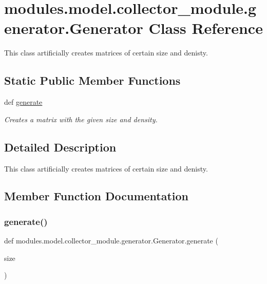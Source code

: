 \hypertarget{classmodules_1_1model_1_1collector__module_1_1generator_1_1_generator}{}\section{modules.\+model.\+collector\+\_\+module.\+generator.\+Generator Class Reference}
\label{classmodules_1_1model_1_1collector__module_1_1generator_1_1_generator}


This class artificially creates matrices of certain size and denisty.  


\subsection*{Static Public Member Functions}
\begin{DoxyCompactItemize}
\item 
def \mbox{\hyperlink{classmodules_1_1model_1_1collector__module_1_1generator_1_1_generator_ab8fb74519a723b30821ba587f5e1223b}{generate}}
\begin{DoxyCompactList}\small\item\em Creates a matrix with the given size and density. \end{DoxyCompactList}\end{DoxyCompactItemize}


\subsection{Detailed Description}
This class artificially creates matrices of certain size and denisty. 

\subsection{Member Function Documentation}
\mbox{\label{classmodules_1_1model_1_1collector__module_1_1generator_1_1_generator_ab8fb74519a723b30821ba587f5e1223b}} 
\subsubsection{\texorpdfstring{generate()}{generate()}}
{\footnotesize\ttfamily def modules.\+model.\+collector\+\_\+module.\+generator.\+Generator.\+generate (\begin{DoxyParamCaption}\item[{}]{size }\end{DoxyParamCaption})\hspace{0.3cm}{\ttfamily [static]}}



